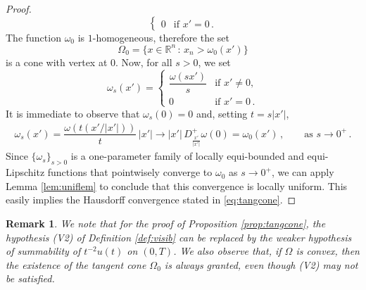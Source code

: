 \documentclass[a4paper,reqno,11pt]{amsart}
\newtheorem{remark}[theorem]{Remark}
\newcommand{\R}{\mathbb{R}}
\newcommand{\ra}{\rightarrow}
\begin{document}
\begin{proof}
\begin{equation*}
\begin{cases}
0 &  \text{if } x' = 0 \, . 
\end{cases}
\end{equation*}
		The function $\omega_{0}$ is $1$-homogeneous, therefore the set
		\begin{equation*}
			\Omega_{0} = \{ x \in \R^{n} \, : \, x_{n} > \omega_{0}(x') \}
		\end{equation*}
		is a cone with vertex at $0$. Now, for all $s > 0$, we set
		\begin{equation*} %
			\omega_{s}(x') = 
			\begin{cases}
				\dfrac{\omega(sx')}{s} & \text{if } x' \neq 0,\\ 
				0 &  \text{if } x' = 0 \, . 
			\end{cases}
		\end{equation*}
		It is immediate to observe that $\omega_{s}(0) = 0$ and, setting $t = s |x'|$,
		\begin{align*}
			\omega_{s}(x') = \dfrac{\omega \left(t (x' / |x'|)  \right)}{t} \, |x'| \rightarrow |x'| \, D^{+}_{\frac{x'}{|x'|}} \omega (0) = \omega_{0}(x') \, , \qquad \text{as $s \ra 0^+ \, .$}
		\end{align*}
		Since $\{ \omega_{s} \}_{s > 0}$ is a one-parameter family of locally equi-bounded and equi-Lipschitz functions that pointwisely converge to $\omega_{0}$ as $s \rightarrow 0^{+}$, we can apply Lemma \ref{lem:uniflem} to conclude that this convergence is locally uniform. This easily implies the Hausdorff convergence stated in \eqref{eq:tangcone}.
	\end{proof}
\begin{remark}
We note that for the proof of Proposition \ref{prop:tangcone}, the hypothesis (V2) of Definition \ref{def:visib} can be replaced by the weaker hypothesis of summability of $t^{-2}u(t)$ on $(0,T)$. We also observe that, if $\Omega$ is convex, then the existence of the tangent cone $\Omega_0$ is always granted, even though (V2) may not be satisfied.
\end{remark}
	
\end{document}
